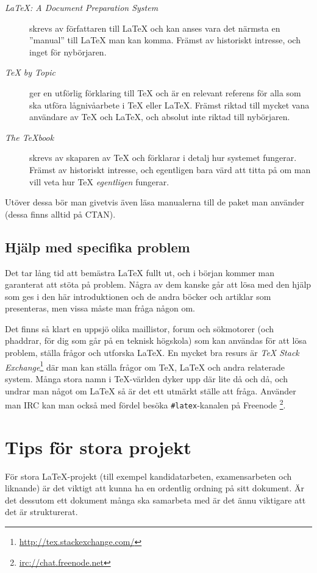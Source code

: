 \documentclass[10pt,../../a4.tex]{subfiles}
\begin{document}
\begin{description}
	\item[\emph{\LaTeX: A Document Preparation System} \parencite{Lamport94}]
	skrevs av författaren till \LaTeX{} och kan anses vara det närmsta en
	”manual” till \LaTeX{} man kan komma. Främst av historiskt intresse,
	och inget för nybörjaren.
	
	\item[\emph{\TeX{} by Topic} \parencite{Eijkhout92}]
	ger en utförlig förklaring till \TeX{} och är en relevant referens för
	alla som ska utföra lågnivåarbete i \TeX{} eller \LaTeX{}. Främst
	riktad till mycket vana användare av \TeX{} och \LaTeX{}, och absolut
	inte riktad till nybörjaren.
	
	\item[\emph{The \TeX{}book} \parencite{Knuth86}]
	skrevs av skaparen av \TeX{} och förklarar i detalj hur systemet
	fungerar. Främst av historiskt intresse, och egentligen bara värd att
	titta på om man vill veta hur \TeX{} \emph{egentligen} fungerar.
\end{description}

Utöver dessa bör man givetvis även läsa manualerna till de paket man
använder (dessa finns alltid på CTAN).

\subsection{Hjälp med specifika problem}
Det tar lång tid att bemästra \LaTeX{} fullt ut, och i början kommer man
garanterat att stöta på problem. Några av dem kanske går att lösa med den
hjälp som ges i den här introduktionen och de andra böcker och artiklar
som presenteras, men vissa måste man fråga någon om.

Det finns så klart en uppsjö olika maillistor, forum och sökmotorer (och
phaddrar, för dig som går på en teknisk högskola) som kan användas för att
lösa problem, ställa frågor och utforska \LaTeX. En mycket bra resurs är
\emph{\TeX{} Stack Exchange}\footnote{\url{http://tex.stackexchange.com/}}
där man kan ställa frågor om \TeX, \LaTeX{} och andra relaterade system.
Många stora namn i \TeX-världen dyker upp där lite då och då, och undrar
man något om \LaTeX{} så är det ett utmärkt ställe att fråga. Använder man
IRC kan man också med fördel besöka \verb|#latex|-kanalen på Freenode%
\footnote{\url{irc://chat.freenode.net}}.

\section{Tips för stora projekt}
För stora \LaTeX-projekt (till exempel kandidatarbeten, examensarbeten
och liknande) är det viktigt att kunna ha en ordentlig ordning på sitt
dokument. Är det dessutom ett dokument många ska samarbeta med är det
ännu viktigare att det är strukturerat.
\end{document}
